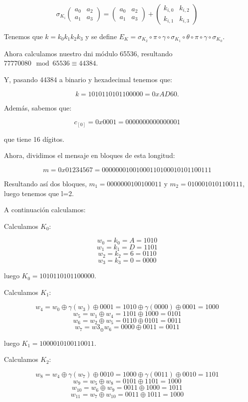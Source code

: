 \documentclass[a4paper]{article}
\begin{document}
$$\sigma_{K_i} \begin{pmatrix} a_0 & a_2 \\ a_1 & a_3 \end{pmatrix} = \begin{pmatrix} a_0 & a_2 \\ a_1 & a_3 \end{pmatrix} + \begin{pmatrix} k_{i,0} & k_{i,2} \\ k_{i,1} & k_{i,3} \end{pmatrix}$$



Tenemos que $k=k_0k_1k_2k_3$ y se define $E_K=\sigma_{K_2} \circ \pi \circ \gamma \circ \sigma_{K_1} \circ \theta \circ \pi \circ \gamma \circ \sigma_{K_0}$.

Ahora calculamos nuestro dni módulo 65536, resultando $77770080\mod 65536\equiv 44384$.

Y, pasando 44384 a binario y hexadecimal tenemos que:

$$k = 1010110101100000 = 0xAD60.$$

Además, sabemos que:

$$c_{[0]}=0x0001=0000 0000 0000 0001$$

que tiene 16 dígitos.

Ahora, dividimos el mensaje en bloques de esta longitud:

$$m = 0x01234567 = 0000 0001 0010 0011 0100 0101 0110 0111$$

Resultando así dos bloques, $m_1=0000 0001 0010 0011$ y $m_2=0100 0101 0110 0111$, luego tenemos que l=2.

A continuación calculamos:

Calculamos $K_0$:

$$w_0 = k_0 = A = 1010$$
$$w_1 = k_1 = D = 1101$$
$$w_2 = k_2 = 6 = 0110$$
$$w_3 = k_3 = 0 = 0000$$

luego $K_0=1010 1101 0110 0000$.

Calculamos $K_1$:

$$w_4 = w_0 \oplus \gamma (w_3) \oplus 0001 = 1010 \oplus \gamma (0000) \oplus 0001 = 1000$$
$$w_5 = w_1 \oplus w_4 = 1101 \oplus 1000 = 0101$$
$$w_6 = w_2 \oplus w_5 = 0110 \oplus 0101 = 0011$$
$$w_7 = w3_ \oplus w_6 = 0000 \oplus 0011 = 0011$$

luego $K_1=1000 0101 0011 0011$.

Calculamos $K_2$:

$$w_8 = w_4 \oplus \gamma (w_7) \oplus 0010 = 1000 \oplus \gamma (0011) \oplus 0010 = 1101$$
$$w_9 = w_5 \oplus w_8 = 0101 \oplus 1101 = 1000$$
$$w_{10} = w_6 \oplus w_9 = 0011 \oplus 1000 = 1011$$
$$w_{11} = w_7 \oplus w_{10} = 0011 \oplus  1011 = 1000$$
\end{document}
